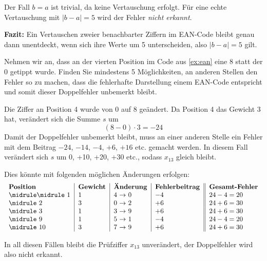 \begin{myexercise}
\begin{mychallenge}
\begin{myanswer}
            Der Fall $b = a$ ist trivial, da keine Vertauschung erfolgt. Für eine echte Vertauschung mit $|b - a| = 5$ wird der Fehler \emph{nicht erkannt}.

            \medskip

            \textbf{Fazit:} Ein Vertauschen zweier benachbarter Ziffern im EAN-Code bleibt genau dann unentdeckt, wenn sich ihre Werte um 5 unterscheiden, also $|b - a| = 5$ gilt.

        \end{myanswer}
    \end{mychallenge}



\end{myexercise}

\begin{myexercise}
    Nehmen wir an, dass an der vierten Position im Code aus \cref{ex:ean} eine 8 statt der 0 getippt wurde. Finden Sie mindestens 5 Möglichkeiten, an anderen Stellen den Fehler so zu machen, dass die fehlerhafte Darstellung einem EAN-Code entspricht und somit dieser Doppelfehler unbemerkt bleibt.
    \begin{myanswer}
        Die Ziffer an Position 4 wurde von 0 auf 8 geändert. Da Position 4 das Gewicht 3 hat, verändert sich die Summe $s$ um
        \[
            (8-0) \cdot 3 = -24
        \]
        Damit der Doppelfehler unbemerkt bleibt, muss an einer anderen Stelle ein Fehler mit dem Beitrag $-24$, $-14$, $-4$, $+6$, $+16$ etc. gemacht werden. In diesem Fall verändert sich $s$ um 0, +10, +20, +30 etc., sodass $x_{13}$ gleich bleibt.

        Dies könnte mit folgenden möglichen Änderungen erfolgen:
        \[
            \begin{tabular}{l|l|l|l||l}
                \textbf{Position} & \textbf{Gewicht} & \textbf{Änderung} & \textbf{Fehlerbeitrag} & \textbf{Gesamt-Fehler} \\
                \midrule\midrule
                1                 & 1                & 4 $\rightarrow$ 0 & $-4$                   & $24-4=20$              \\\midrule
                2                 & 3                & 0 $\rightarrow$ 2 & $+6$                   & $24+6=30$              \\\midrule
                3                 & 1                & 3 $\rightarrow$ 9 & $+6$                   & $24+6=30$              \\\midrule
                9                 & 1                & 5 $\rightarrow$ 1 & $-4$                   & $24-4=20$              \\\midrule
                10                & 3                & 7 $\rightarrow$ 9 & $+6$                   & $24+6=30$              \\
            \end{tabular}
        \]

        In all diesen Fällen bleibt die Prüfziffer $x_{13}$ unverändert, der Doppelfehler wird also nicht erkannt.

    \end{myanswer}
\end{myexercise}

